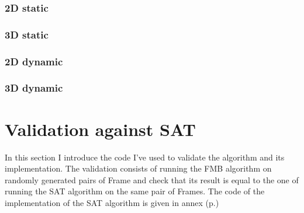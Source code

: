 \documentclass[12pt, a4paper]{article}
\begin{document}
\subsubsection{2D static}

\begin{scriptsize}
\begin{ttfamily}

\end{ttfamily}
\end{scriptsize}

\subsubsection{3D static}

\begin{scriptsize}
\begin{ttfamily}

\end{ttfamily}
\end{scriptsize}

\subsubsection{2D dynamic}

\begin{scriptsize}
\begin{ttfamily}

\end{ttfamily}
\end{scriptsize}

\subsubsection{3D dynamic}

\begin{scriptsize}
\begin{ttfamily}

\end{ttfamily}
\end{scriptsize}

\section{Validation against SAT}

In this section I introduce the code I've used to validate the algorithm and its implementation. The validation consists of running the FMB algorithm on randomly generated pairs of Frame and check that its result is equal to the one of running the SAT algorithm on the same pair of Frames. The code of the implementation of the SAT algorithm is given in annex (p.\pageref{sat_implementation})\\
\end{document}
